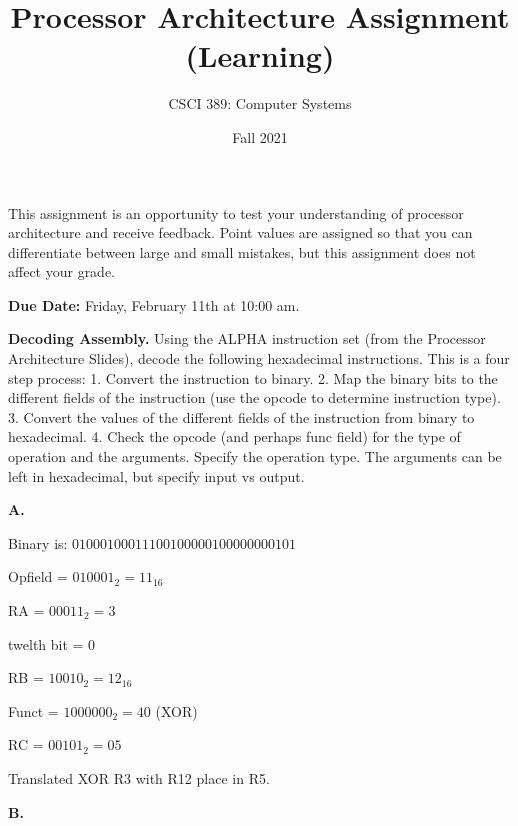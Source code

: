 \documentclass{exam}
\begin{document}
\title{Processor Architecture Assignment (Learning)}
\author{CSCI 389: Computer Systems}
\date{Fall 2021}
\maketitle


This assignment is an opportunity to test your understanding of processor architecture and receive feedback. 
Point values are assigned so that you can differentiate between large and small mistakes, but this assignment does not affect your grade. 

\textbf{Due Date:}
Friday, February 11th at 10:00 am. 

\begin{questions}

\question[8]
\textbf{Decoding Assembly.}
Using the ALPHA instruction set (from the Processor Architecture Slides), decode the following hexadecimal instructions. 
This is a four step process: 
1. Convert the instruction to binary. 
2. Map the binary bits to the different fields of the instruction (use the opcode to determine instruction type). 
3. Convert the values of the different fields of the instruction from binary to hexadecimal. 
4. Check the opcode (and perhaps func field) for the type of operation and the arguments. 
Specify the operation type. The arguments can be left in hexadecimal, but specify input vs output. 

\textbf{A.}

Binary is: $0100 0100 0111 0010 0000 1000 0000 0101$

Opfield = $0100 01_{2}=11_{16}$

RA = $00 011_{2}= 3$

twelth bit = 0

RB = $1 0010_{2}=12_{16}$

Funct = $1000 000_{2}=40$ (XOR)

RC = $0 0101_{2}=05$

Translated XOR R3 with R12 place in R5. 

\textbf{B.}


\end{questions}
\end{document}
